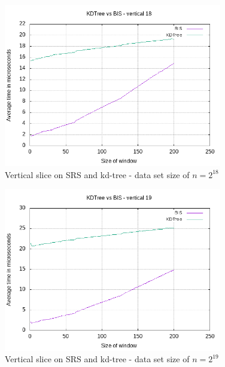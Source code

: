 \begin{figure}[h]
    \centering
    \includegraphics[width = 0.85\textwidth]{pictures/analysis/smalls/vert_18.png}
    \caption{Vertical slice on SRS and kd-tree - data set size of $n=2^{18}$}\label{fig:small_vert_18}
\end{figure}

\begin{figure}[h]
    \centering
    \includegraphics[width = 0.85\textwidth]{pictures/analysis/smalls/vert_19.png}
    \caption{Vertical slice on SRS and kd-tree - data set size of $n=2^{19}$}\label{fig:small_vert_19}
\end{figure}

